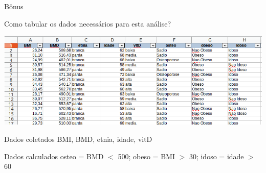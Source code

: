 \documentclass{beamer}
\begin{document}
\begin{frame}[fragile]{\scriptsize Bônus}
  \begin{exampleblock}{Como tabular os dados necessários para esta análise?}
    \tiny
    \begin{center}
      \includegraphics[width=\textwidth]{Cap31-32/pratica-glm-dados}
    \end{center}
    \begin{exampleblock}{Dados coletados}
      BMI, BMD, etnia, idade, vitD
    \end{exampleblock}
    \begin{exampleblock}{Dados calculados}
      osteo = BMD $<$ 500; obeso = BMI $>$ 30; idoso = idade $>$ 60
    \end{exampleblock}

  \end{exampleblock}
\end{frame}

\end{document}

